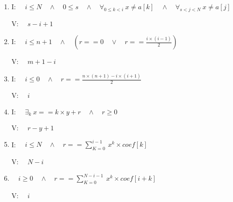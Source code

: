 \documentclass{article}
\begin{document}
\begin{enumerate}[label=\alph*)]
    \item I: $ \quad i \leq N \quad \land \quad 0 \leq s \quad \land \quad \forall_{0 \leq k < i} \  x \neq a[k] \quad \land \quad \forall_{s < j < N} \  x \neq a[j] $
    
    V: $ \quad s - i + 1 $
    
    \item I: $ \quad i \leq n + 1 \quad \land \quad (r == 0 \quad \lor \quad r == \frac{i \times (i-1)}{2}) $
    
    V: $ \quad m + 1 - i $
    
    \item I: $ \quad i \leq 0 \quad \land \quad r == \frac{n \times (n+1) - i \times (i+1)}{2} $
    
    V: $ \quad i $
    
    \item I: $ \quad \exists_k \  x == k \times y + r \quad \land \quad r \geq 0 $
    
    V: $ \quad r - y + 1 $
    
    \item I: $ \quad i \leq N \quad \land \quad r == \sum_{K=0}^{i-1} \  x^k \times coef[k] $
    
    V: $ \quad N - i $
    
    \item $ \quad i \geq 0 \quad \land \quad r == \sum_{K=0}^{N-i-1} \  x^k \times coef[i+k] $
    
    V: $ \quad i $
\end{enumerate}
\end{document}

